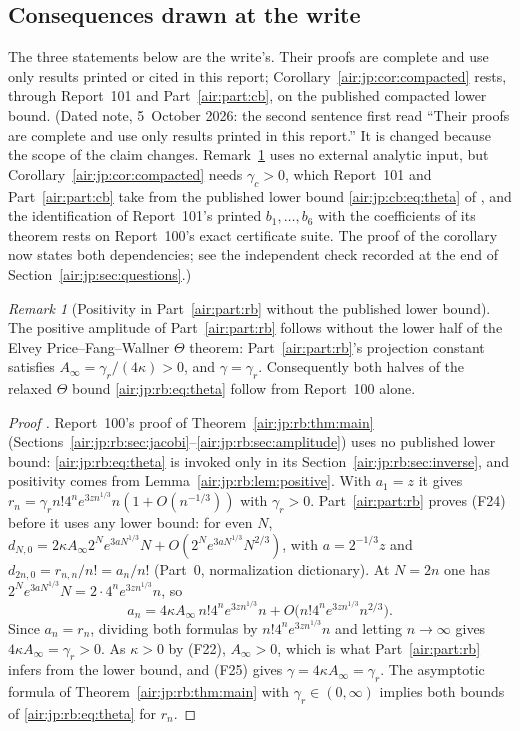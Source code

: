 \documentclass[11pt,letterpaper]{article}
\numberwithin{equation}{section}
\theoremstyle{remark}
\newtheorem{remark}[theorem]{Remark}
\begin{document}
\subsection{Consequences drawn at the write}\label{air:jp:sec:write}
The three statements below are the write's. Their proofs are complete and use only results printed or cited in this report; Corollary~\ref{air:jp:cor:compacted} rests, through Report~101 and Part~\ref{air:part:cb}, on the published compacted lower bound. (Dated note, 5~October 2026: the second sentence first read ``Their proofs are complete and use only results printed in this report.'' It is changed because the scope of the claim changes. Remark~\ref{air:jp:rem:positivity} uses no external analytic input, but Corollary~\ref{air:jp:cor:compacted} needs $\gamma_c>0$, which Report~101 and Part~\ref{air:part:cb} take from the published lower bound \eqref{air:jp:cb:eq:theta} of \cite{epfw}, and the identification of Report~101's printed $b_1,\ldots,b_6$ with the coefficients of its theorem rests on Report~100's exact certificate suite. The proof of the corollary now states both dependencies; see the independent check recorded at the end of Section~\ref{air:jp:sec:questions}.)

\begin{remark}[Positivity in Part~\ref{air:part:rb} without the published lower bound]\label{air:jp:rem:positivity}
The positive amplitude of Part~\ref{air:part:rb} follows without the lower half of the Elvey Price--Fang--Wallner $\Theta$ theorem: Part~\ref{air:part:rb}'s projection constant satisfies $A_\infty=\gamma_r/(4\kappa)>0$, and $\gamma=\gamma_r$. Consequently both halves of the relaxed $\Theta$ bound \eqref{air:jp:rb:eq:theta} follow from Report~100 alone.
\end{remark}
\begin{proof}[Proof {\normalfont[write]}]
Report~100's proof of Theorem~\ref{air:jp:rb:thm:main} (Sections~\ref{air:jp:rb:sec:jacobi}--\ref{air:jp:rb:sec:amplitude}) uses no published lower bound: \eqref{air:jp:rb:eq:theta} is invoked only in its Section~\ref{air:jp:rb:sec:inverse}, and positivity comes from Lemma~\ref{air:jp:rb:lem:positive}. With $a_1=z$ it gives $r_n=\gamma_rn!4^ne^{3zn^{1/3}}n(1+O(n^{-1/3}))$ with $\gamma_r>0$. Part~\ref{air:part:rb} proves (F24) before it uses any lower bound: for even $N$, $d_{N,0}=2\kappa A_\infty2^Ne^{3aN^{1/3}}N+O(2^Ne^{3aN^{1/3}}N^{2/3})$, with $a=2^{-1/3}z$ and $d_{2n,0}=r_{n,n}/n!=a_n/n!$ (Part~0, normalization dictionary). At $N=2n$ one has $2^Ne^{3aN^{1/3}}N=2\cdot4^ne^{3zn^{1/3}}n$, so
\[
 a_n=4\kappa A_\infty\,n!4^ne^{3zn^{1/3}}n+O\bigl(n!4^ne^{3zn^{1/3}}n^{2/3}\bigr).
\]
Since $a_n=r_n$, dividing both formulas by $n!4^ne^{3zn^{1/3}}n$ and letting $n\to\infty$ gives $4\kappa A_\infty=\gamma_r>0$. As $\kappa>0$ by (F22), $A_\infty>0$, which is what Part~\ref{air:part:rb} infers from the lower bound, and (F25) gives $\gamma=4\kappa A_\infty=\gamma_r$. The asymptotic formula of Theorem~\ref{air:jp:rb:thm:main} with $\gamma_r\in(0,\infty)$ implies both bounds of \eqref{air:jp:rb:eq:theta} for $r_n$.
\end{proof}
\end{document}
